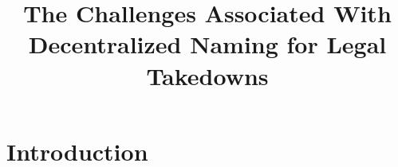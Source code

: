 \documentclass[10pt,sigconf,letterpaper]{acmart}
\begin{document}

\title{The Challenges Associated With Decentralized Naming for Legal Takedowns}





\maketitle
\pagestyle{plain}

\section{Introduction}
\end{document}

